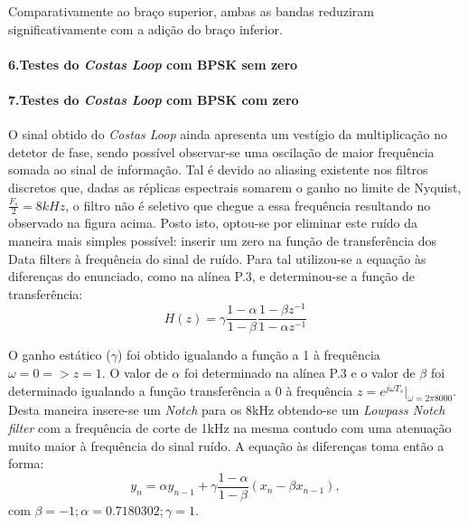 \documentclass[11pt]{article}
\numberwithin{equation}{section}
\begin{document}
Comparativamente ao braço superior, ambas as bandas reduziram significativamente com a adição do braço inferior.

\paragraph{6.Testes do \textit{Costas Loop} com BPSK sem zero} \hspace{0pt} \label{para:P3-6}

\paragraph{7.Testes do \textit{Costas Loop} com BPSK com zero} \hspace{0pt} \label{para:P3-7}

O sinal obtido do \textit{Costas Loop} ainda apresenta um vestígio da multiplicação no detetor de fase, sendo possível observar-se uma oscilação de maior frequência somada ao sinal de informação. Tal é devido ao aliasing existente nos filtros discretos que, dadas as réplicas espectrais somarem o ganho no limite de Nyquist, $\frac{F_s}{2} = 8kHz$, o filtro  não é seletivo que chegue a essa frequência resultando no observado na figura acima. Posto isto, optou-se por eliminar este ruído da maneira mais simples possível: inserir um zero na função de transferência dos Data filters à frequência do sinal de ruído. Para tal utilizou-se a equação às diferenças do enunciado, como na alínea P.3, e determinou-se a função de transferência:
\begin{equation}
H(z) = \gamma\frac{1-\alpha}{1-\beta}\dfrac{1-\beta z^{-1}}{1-\alpha z^{-1}}
\end{equation}

O ganho estático ($\gamma$) foi obtido igualando a função a 1 à frequência $\omega=0 => z=1$. O valor de $\alpha$ foi determinado na alínea P.3 e o valor de $\beta$ foi determinado igualando a função transferência a 0 à frequência $z=e^{j\omega T_s}|_{\omega=2\pi8000}$. Desta maneira insere-se um \textit{Notch} para os 8kHz obtendo-se um \textit{Lowpass Notch filter} com a frequência de corte de 1kHz na mesma contudo com uma atenuação muito maior à frequência do sinal ruído.
A equação às diferenças toma então a forma:
\begin{equation}
y_n = \alpha y_{n-1}+\gamma\frac{1-\alpha}{1-\beta}(x_n-\beta x_{n-1}), 
\end{equation}
com $\beta=-1; \alpha=0.7180302; \gamma=1.$
\end{document}
